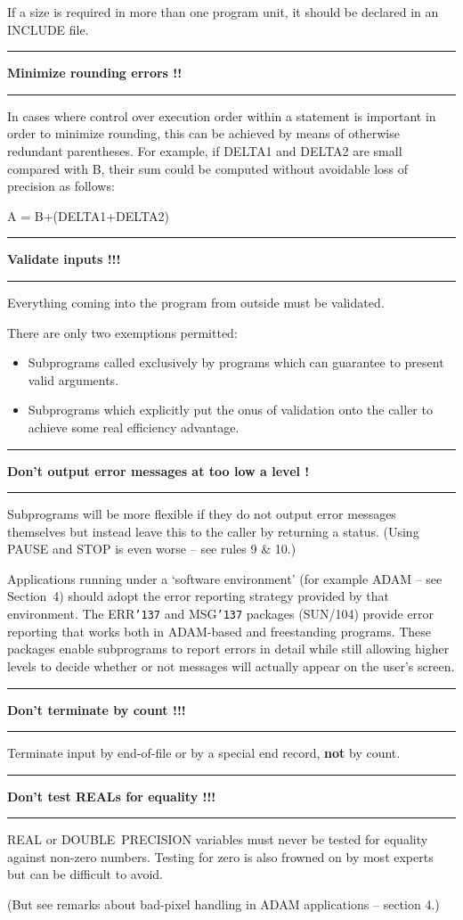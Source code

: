 \documentclass[twoside,11pt,nolof,noabs]{starlink}
\newcounter{sruleno}
\providecommand{\srule}[1]{
    \addtocounter{sruleno}{1}
    \goodbreak
    \rule{\textwidth}{0.3mm}
    \textbf{#1} \scpushright{ \textbf{\thesruleno}}
    \rule{\textwidth}{0.1mm}
}
\renewcommand{\_}{{\tt\char'137}}
\begin{document}
If a size is required in more than one program unit, it should be
declared in an INCLUDE file.

\srule{Minimize rounding errors !!}
In cases where control over execution order within a
statement is important in order to minimize rounding, this
can be achieved by means of otherwise redundant parentheses.
For example, if DELTA1 and DELTA2 are small compared with B, their sum could be
computed without avoidable loss of precision as follows:
\begin{terminalv}
    A = B+(DELTA1+DELTA2)
\end{terminalv}

\srule{Validate inputs !!!}
Everything coming into the program from outside must be validated.

There are only two exemptions permitted:
\begin{itemize}
\item Subprograms called exclusively by programs which can guarantee to present
valid arguments.
\item Subprograms which explicitly put the onus of validation onto the caller to
achieve some real efficiency advantage.
\end{itemize}

\srule{Don't output error messages at too low a level !}
Subprograms will be more flexible if they
do not output error messages themselves but
instead leave this to the caller by returning a status.
(Using PAUSE and STOP is even worse -- see rules 9 \& 10.)

Applications running under a `software environment' (for example ADAM -- see
Section~4) should adopt the error reporting
strategy provided by that environment.  The
ERR\_ and MSG\_ packages (SUN/104) provide error reporting that works both
in ADAM-based and freestanding programs.  These packages enable subprograms
to report errors in detail while still allowing higher levels to
decide whether or not messages will actually appear on the user's
screen.

\srule{Don't terminate by count !!!}
Terminate input by end-of-file or by a special end record, \textbf{not} by
count.

\srule{Don't test REALs for equality !!!}
REAL or DOUBLE~PRECISION variables must never be tested for equality
against non-zero numbers.  Testing for zero is also frowned on by most
experts but can be difficult to avoid.

(But see remarks about bad-pixel handling in ADAM applications -- section 4.)
\end{document}
